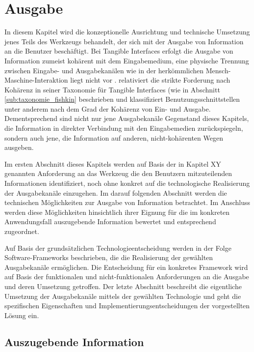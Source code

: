 
\chapter{Ausgabe} %
\label{cha:visualisierung}

In diesem Kapitel wird die konzeptionelle Ausrichtung und technische Umsetzung jenes Teils des Werkzeugs behandelt, der sich mit der Ausgabe von Information an die Benutzer beschäftigt. Bei Tangible Interfaces erfolgt die Ausgabe von Information zumeist kohärent mit dem Eingabemedium, eine physische Trennung zwischen Eingabe- und Ausgabekanälen wie in der herkömmlichen Mensch-Maschine-Interaktion liegt nicht vor \citep{Ullmer00}. \citet{Fishkin04} relativiert die strikte Forderung nach Kohärenz in seiner Taxonomie für Tangible Interfaces (wie in Abschnitt \ref{sub:taxonomie_fishkin} beschrieben und klassifiziert Benutzungsschnittstellen unter anderem nach dem Grad der Kohärenz von Ein- und Ausgabe. Dementsprechend sind nicht nur jene Ausgabekanäle Gegenstand dieses Kapitels, die Information in direkter Verbindung mit den Eingabemedien zurückspiegeln, sondern auch jene, die Information auf anderen, nicht-kohärenten Wegen ausgeben.

Im ersten Abschnitt dieses Kapitels werden auf Basis der in Kapitel XY genannten Anforderung an das Werkzeug die den Benutzern mitzuteilenden Informationen identifiziert, noch ohne konkret auf die technologische Realisierung der Ausgabekanäle einzugehen. Im darauf folgenden Abschnitt werden die technischen Möglichkeiten zur Ausgabe von Information betrachtet. Im Anschluss werden diese Möglichkeiten hinsichtlich ihrer Eignung für die im konkreten Anwendungsfall auszugebende Information bewertet und entsprechend zugeordnet.

Auf Basis der grundsätzlichen Technologieentscheidung werden in der Folge Software-Frameworks beschrieben, die die Realisierung der gewählten Ausgabekanäle ermöglichen. Die Entscheidung für ein konkretes Framework wird auf Basis der funktionalen und nicht-funktionalen Anforderungen an die Ausgabe und deren Umsetzung getroffen. Der letzte Abschnitt beschreibt die eigentliche Umsetzung der Ausgabekanäle mittels der gewählten Technologie und geht die spezifischen Eigenschaften und Implementierungsentscheidungen der vorgestellten Lösung ein.

\section{Auszugebende Information} %
\label{sec:auszugebende_information}

